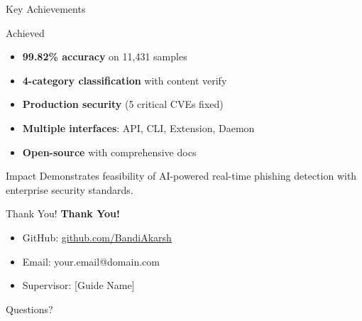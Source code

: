 \documentclass[10pt, aspectratio=169]{beamer}
\begin{document}
\begin{frame}{Key Achievements}
    \begin{block}{Achieved}
        \begin{itemize}
            \item \textbf{99.82\% accuracy} on 11,431 samples
            \item \textbf{4-category classification} with content verify
            \item \textbf{Production security} (5 critical CVEs fixed)
            \item \textbf{Multiple interfaces}: API, CLI, Extension, Daemon
            \item \textbf{Open-source} with comprehensive docs
        \end{itemize}
    \end{block}
    
    \begin{block}{Impact}
        Demonstrates feasibility of AI-powered real-time phishing detection with enterprise security standards.
    \end{block}
\end{frame}

\begin{frame}{Thank You!}
    \centering
    \Huge\textbf{Thank You!}
    
    \vspace{1cm}
    \large
    \begin{itemize}
        \item GitHub: \url{github.com/BandiAkarsh}
        \item Email: your.email@domain.com
        \item Supervisor: [Guide Name]
    \end{itemize}
    
    \vspace{1cm}
    \normalsize
    Questions?
\end{frame}
\end{document}
